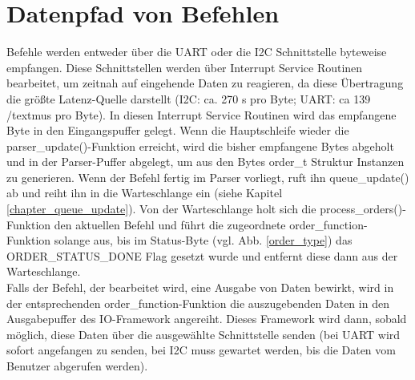\section{Datenpfad von Befehlen}
Befehle werden entweder über die UART oder die I2C Schnittstelle byteweise empfangen. Diese Schnittstellen werden über
Interrupt Service Routinen bearbeitet, um zeitnah auf eingehende Daten zu reagieren, da diese Übertragung die größte
Latenz-Quelle darstellt (I2C: ca. 270 \textmu{}s pro Byte; UART: ca 139 /textmu{}s pro Byte). In diesen Interrupt Service Routinen wird
das empfangene Byte in den Eingangspuffer gelegt. Wenn die Hauptschleife wieder die parser\_\-update()-Funktion erreicht,
wird die bisher empfangene Bytes abgeholt und in der Parser-Puffer abgelegt, um aus den Bytes order\_t Struktur Instanzen
zu generieren. Wenn der Befehl fertig im Parser vorliegt, ruft ihn queue\_\-update() ab und reiht ihn in die Warteschlange
ein (siehe Kapitel \ref{chapter_queue_update}). Von der Warteschlange holt sich die process\_\-orders()-Funktion den
aktuellen Befehl und führt die zugeordnete order\_function-Funktion solange aus, bis im Status-Byte (vgl. Abb. \ref{order_type})
das ORDER\_\-STATUS\_\-DONE Flag gesetzt wurde und entfernt diese dann aus der Warteschlange.\\
Falls der Befehl, der bearbeitet wird, eine Ausgabe von Daten bewirkt, wird in der entsprechenden order\_\-function-Funktion
die auszugebenden Daten in den Ausgabepuffer des IO-Framework angereiht. Dieses Framework wird dann, sobald möglich, diese Daten
über die ausgewählte Schnittstelle senden (bei UART wird sofort angefangen zu senden, bei I2C muss gewartet werden, bis die Daten
vom Benutzer abgerufen werden).
